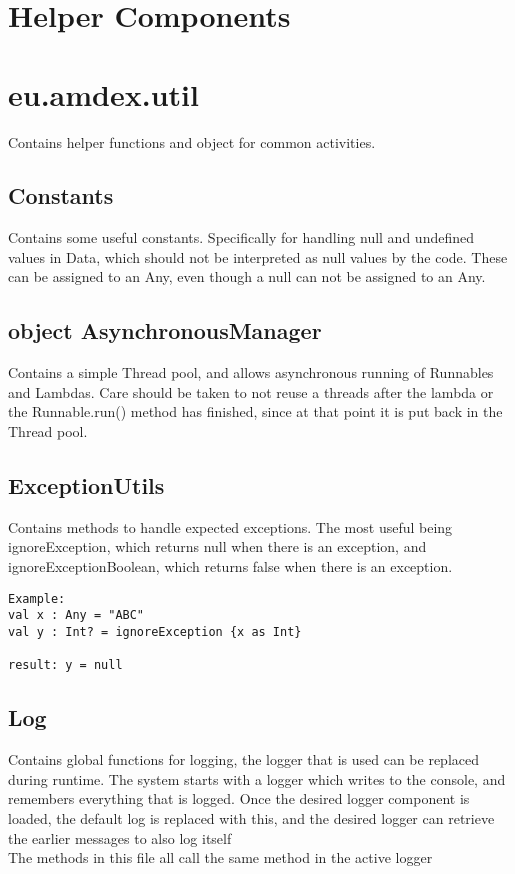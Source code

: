 \documentclass{article}
\begin{document}
\section{Helper Components}

\section{eu.amdex.util}
Contains helper functions and object for common activities. 
\subsection{Constants}
Contains some useful constants. Specifically for handling null and undefined values in Data, which should not be interpreted as null values by the code. These can be assigned to an Any, even though a null can not be assigned to an Any. 
\subsection{object AsynchronousManager}
Contains a simple Thread pool, and allows asynchronous running of Runnables and Lambdas. Care should be taken to not reuse a threads after the lambda or the Runnable.run() method has finished, since at that point it is put back in the Thread pool.
\subsection{ExceptionUtils}
Contains methods to handle expected exceptions. The most useful being ignoreException, which returns null when there is an exception, and ignoreExceptionBoolean, which returns false when there is an exception. \\
\begin{verbatim}
Example:
val x : Any = "ABC"
val y : Int? = ignoreException {x as Int}

result: y = null    
\end{verbatim}
\subsection{Log}
Contains global functions for logging, the logger that is used can be replaced during runtime. The system starts with a logger which writes to the console, and remembers everything that is logged. Once the desired logger component is loaded, the default log is replaced with this, and the desired logger can retrieve the earlier messages to also log itself\\
The methods in this file all call the same method in the active logger
\end{document}
